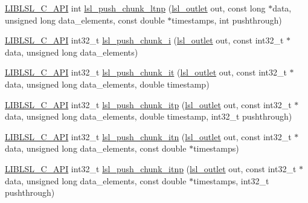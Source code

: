 \begin{DoxyCompactItemize}
\item 
\hyperlink{lsl__cpp_8h_aafd0ef1813e8be84a1420c4f1df64615}{L\+I\+B\+L\+S\+L\+\_\+\+C\+\_\+\+A\+PI} int \hyperlink{namespacelsl_aa172a29d0976aee8d41306d7b8b53231}{lsl\+\_\+push\+\_\+chunk\+\_\+ltnp} (\hyperlink{namespacelsl_abcf512b0f66dacf86c10b165995fd50b}{lsl\+\_\+outlet} out, const long $\ast$data, unsigned long data\+\_\+elements, const double $\ast$timestamps, int pushthrough)
\item 
\hyperlink{lsl__cpp_8h_aafd0ef1813e8be84a1420c4f1df64615}{L\+I\+B\+L\+S\+L\+\_\+\+C\+\_\+\+A\+PI} int32\+\_\+t \hyperlink{namespacelsl_a096b23637c04d20bcaea1a92bc438845}{lsl\+\_\+push\+\_\+chunk\+\_\+i} (\hyperlink{namespacelsl_abcf512b0f66dacf86c10b165995fd50b}{lsl\+\_\+outlet} out, const int32\+\_\+t $\ast$data, unsigned long data\+\_\+elements)
\item 
\hyperlink{lsl__cpp_8h_aafd0ef1813e8be84a1420c4f1df64615}{L\+I\+B\+L\+S\+L\+\_\+\+C\+\_\+\+A\+PI} int32\+\_\+t \hyperlink{namespacelsl_aede257c8d3911fbc26329bd4af8bcc9a}{lsl\+\_\+push\+\_\+chunk\+\_\+it} (\hyperlink{namespacelsl_abcf512b0f66dacf86c10b165995fd50b}{lsl\+\_\+outlet} out, const int32\+\_\+t $\ast$data, unsigned long data\+\_\+elements, double timestamp)
\item 
\hyperlink{lsl__cpp_8h_aafd0ef1813e8be84a1420c4f1df64615}{L\+I\+B\+L\+S\+L\+\_\+\+C\+\_\+\+A\+PI} int32\+\_\+t \hyperlink{namespacelsl_a38439e357a8d6c984ffcfd9e22596ec1}{lsl\+\_\+push\+\_\+chunk\+\_\+itp} (\hyperlink{namespacelsl_abcf512b0f66dacf86c10b165995fd50b}{lsl\+\_\+outlet} out, const int32\+\_\+t $\ast$data, unsigned long data\+\_\+elements, double timestamp, int32\+\_\+t pushthrough)
\item 
\hyperlink{lsl__cpp_8h_aafd0ef1813e8be84a1420c4f1df64615}{L\+I\+B\+L\+S\+L\+\_\+\+C\+\_\+\+A\+PI} int32\+\_\+t \hyperlink{namespacelsl_a0ea52f33684ceab15ad7244636291ddd}{lsl\+\_\+push\+\_\+chunk\+\_\+itn} (\hyperlink{namespacelsl_abcf512b0f66dacf86c10b165995fd50b}{lsl\+\_\+outlet} out, const int32\+\_\+t $\ast$data, unsigned long data\+\_\+elements, const double $\ast$timestamps)
\item 
\hyperlink{lsl__cpp_8h_aafd0ef1813e8be84a1420c4f1df64615}{L\+I\+B\+L\+S\+L\+\_\+\+C\+\_\+\+A\+PI} int32\+\_\+t \hyperlink{namespacelsl_a9102a7929e172f9a42e51211139d691f}{lsl\+\_\+push\+\_\+chunk\+\_\+itnp} (\hyperlink{namespacelsl_abcf512b0f66dacf86c10b165995fd50b}{lsl\+\_\+outlet} out, const int32\+\_\+t $\ast$data, unsigned long data\+\_\+elements, const double $\ast$timestamps, int32\+\_\+t pushthrough)
\item 

\end{DoxyCompactItemize}
